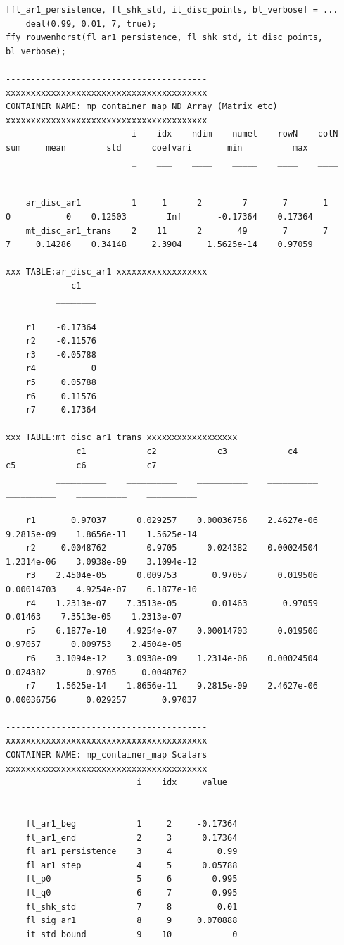 \documentclass[
]{book}
\begin{document}
\begin{verbatim}
[fl_ar1_persistence, fl_shk_std, it_disc_points, bl_verbose] = ...
    deal(0.99, 0.01, 7, true);
ffy_rouwenhorst(fl_ar1_persistence, fl_shk_std, it_disc_points, bl_verbose);

----------------------------------------
xxxxxxxxxxxxxxxxxxxxxxxxxxxxxxxxxxxxxxxx
CONTAINER NAME: mp_container_map ND Array (Matrix etc)
xxxxxxxxxxxxxxxxxxxxxxxxxxxxxxxxxxxxxxxx
                         i    idx    ndim    numel    rowN    colN    sum     mean        std      coefvari       min          max  
                         _    ___    ____    _____    ____    ____    ___    _______    _______    ________    __________    _______

    ar_disc_ar1          1     1      2        7       7       1       0           0    0.12503        Inf       -0.17364    0.17364
    mt_disc_ar1_trans    2    11      2       49       7       7       7     0.14286    0.34148     2.3904     1.5625e-14    0.97059

xxx TABLE:ar_disc_ar1 xxxxxxxxxxxxxxxxxx
             c1   
          ________

    r1    -0.17364
    r2    -0.11576
    r3    -0.05788
    r4           0
    r5     0.05788
    r6     0.11576
    r7     0.17364

xxx TABLE:mt_disc_ar1_trans xxxxxxxxxxxxxxxxxx
              c1            c2            c3            c4            c5            c6            c7    
          __________    __________    __________    __________    __________    __________    __________

    r1       0.97037      0.029257    0.00036756    2.4627e-06    9.2815e-09    1.8656e-11    1.5625e-14
    r2     0.0048762        0.9705      0.024382    0.00024504    1.2314e-06    3.0938e-09    3.1094e-12
    r3    2.4504e-05      0.009753       0.97057      0.019506    0.00014703    4.9254e-07    6.1877e-10
    r4    1.2313e-07    7.3513e-05       0.01463       0.97059       0.01463    7.3513e-05    1.2313e-07
    r5    6.1877e-10    4.9254e-07    0.00014703      0.019506       0.97057      0.009753    2.4504e-05
    r6    3.1094e-12    3.0938e-09    1.2314e-06    0.00024504      0.024382        0.9705     0.0048762
    r7    1.5625e-14    1.8656e-11    9.2815e-09    2.4627e-06    0.00036756      0.029257       0.97037

----------------------------------------
xxxxxxxxxxxxxxxxxxxxxxxxxxxxxxxxxxxxxxxx
CONTAINER NAME: mp_container_map Scalars
xxxxxxxxxxxxxxxxxxxxxxxxxxxxxxxxxxxxxxxx
                          i    idx     value  
                          _    ___    ________

    fl_ar1_beg            1     2     -0.17364
    fl_ar1_end            2     3      0.17364
    fl_ar1_persistence    3     4         0.99
    fl_ar1_step           4     5      0.05788
    fl_p0                 5     6        0.995
    fl_q0                 6     7        0.995
    fl_shk_std            7     8         0.01
    fl_sig_ar1            8     9     0.070888
    it_std_bound          9    10            0
\end{verbatim}
\end{document}
